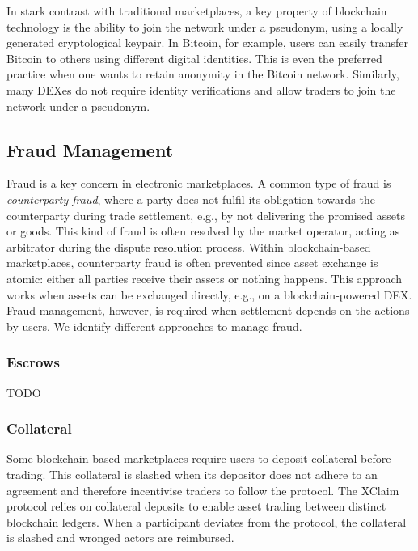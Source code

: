 In stark contrast with traditional marketplaces, a key property of blockchain technology is the ability to join the network under a pseudonym, using a locally generated cryptological keypair.
In Bitcoin, for example, users can easily transfer Bitcoin to others using different digital identities.
This is even the preferred practice when one wants to retain anonymity in the Bitcoin network.
Similarly, many DEXes do not require identity verifications and allow traders to join the network under a pseudonym.

\subsection{Fraud Management}
Fraud is a key concern in electronic marketplaces.
A common type of fraud is \emph{counterparty fraud}, where a party does not fulfil its obligation towards the counterparty during trade settlement, e.g., by not delivering the promised assets or goods.
This kind of fraud is often resolved by the market operator, acting as arbitrator during the dispute resolution process.
Within blockchain-based marketplaces, counterparty fraud is often prevented since asset exchange is atomic: either all parties receive their assets or nothing happens.
This approach works when assets can be exchanged directly, e.g., on a blockchain-powered DEX.
Fraud management, however, is required when settlement depends on the actions by users.
We identify different approaches to manage fraud.

\subsubsection{Escrows}
TODO

\subsubsection{Collateral}
Some blockchain-based marketplaces require users to deposit collateral before trading.
This collateral is slashed when its depositor does not adhere to an agreement and therefore incentivise traders to follow the protocol.
The XClaim protocol relies on collateral deposits to enable asset trading between distinct blockchain ledgers.
When a participant deviates from the protocol, the collateral is slashed and wronged actors are reimbursed.


